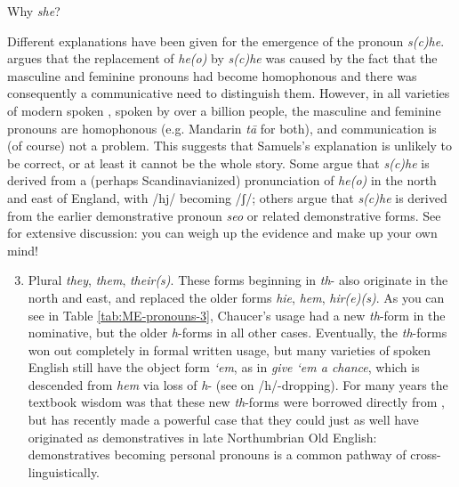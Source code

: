\begin{miscbox}{Why \emph{she}?}

Different explanations have been given for the emergence of the pronoun \emph{s(c)he}. \citet{Samuels1965} argues that the replacement of \emph{he(o)} by \emph{s(c)he} was caused by the fact that the masculine and feminine pronouns had become homophonous and there was consequently a communicative need to distinguish them. However, in all varieties of modern spoken , spoken by over a billion people, the masculine and feminine pronouns are homophonous (e.g. Mandarin \emph{tā} for both), and communication is (of course) not a problem. This suggests that Samuels's explanation is unlikely to be correct, or at least it cannot be the whole story. Some argue that \emph{s(c)he} is derived from a (perhaps Scandinavianized) pronunciation of \emph{he(o)} in the north and east of England, with /hj/ becoming /ʃ/; others argue that \emph{s(c)he} is derived from the earlier demonstrative pronoun \emph{seo} or related demonstrative forms. See \citet{Juengling2001} for extensive discussion: you can weigh up the evidence and make up your own mind!
\end{miscbox}


\begin{enumerate}
\setcounter{enumi}{2}
    \item Plural \emph{they}, \emph{them}, \emph{their(s)}. These forms beginning in \emph{th}- also originate in the north and east, and replaced the older forms \emph{hie}, \emph{hem}, \emph{hir(e)(s)}. As you can see in Table \ref{tab:ME-pronouns-3}, Chaucer's usage had a new \emph{th}-form in the nominative, but the older \emph{h}-forms in all other cases. Eventually, the \emph{th}-forms won out completely in formal written usage, but many varieties of spoken English still have the object form \emph{`em}, as in \emph{give `em a chance}, which is descended from \emph{hem} via loss of \emph{h}- (see  on /h/-dropping). For many years the textbook wisdom was that these new \emph{th}-forms were borrowed directly from , but \citet{Cole2018} has recently made a powerful case that they could just as well have originated as demonstratives in late Northumbrian Old English: demonstratives becoming personal pronouns is a common pathway of  cross-linguistically.
\end{enumerate}


